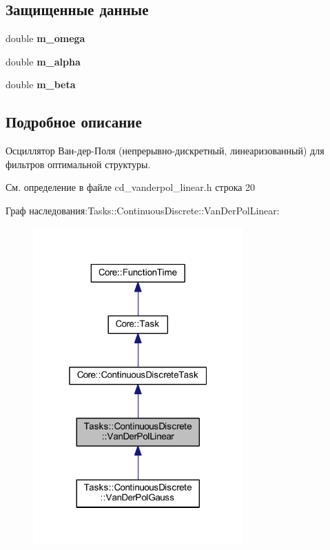 \subsection*{Защищенные данные}
\begin{DoxyCompactItemize}
\item 
\hypertarget{class_tasks_1_1_continuous_discrete_1_1_van_der_pol_linear_a974f4658bee500533be49e053f15172f}{}\label{class_tasks_1_1_continuous_discrete_1_1_van_der_pol_linear_a974f4658bee500533be49e053f15172f} 
double {\bfseries m\+\_\+omega}
\item 
\hypertarget{class_tasks_1_1_continuous_discrete_1_1_van_der_pol_linear_a6e09423b369c869ea4721e465845912a}{}\label{class_tasks_1_1_continuous_discrete_1_1_van_der_pol_linear_a6e09423b369c869ea4721e465845912a} 
double {\bfseries m\+\_\+alpha}
\item 
\hypertarget{class_tasks_1_1_continuous_discrete_1_1_van_der_pol_linear_a9ca2f773ce65c2b69fea3a4a451afd59}{}\label{class_tasks_1_1_continuous_discrete_1_1_van_der_pol_linear_a9ca2f773ce65c2b69fea3a4a451afd59} 
double {\bfseries m\+\_\+beta}
\end{DoxyCompactItemize}


\subsection{Подробное описание}
Осциллятор Ван-\/дер-\/Поля (непрерывно-\/дискретный, линеаризованный) для фильтров оптимальной структуры. 

См. определение в файле cd\+\_\+vanderpol\+\_\+linear.\+h строка 20



Граф наследования\+:Tasks\+:\+:Continuous\+Discrete\+:\+:Van\+Der\+Pol\+Linear\+:
\nopagebreak
\begin{figure}[H]
\begin{center}
\leavevmode
\includegraphics[width=229pt]{class_tasks_1_1_continuous_discrete_1_1_van_der_pol_linear__inherit__graph}
\end{center}
\end{figure}


